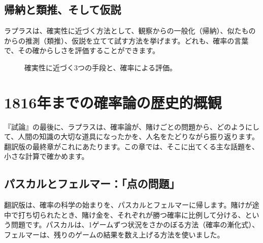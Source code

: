 \documentclass[a4paper,11pt,openany]{ltjsbook}
\begin{document}
\section{帰納と類推、そして仮説}

ラプラスは、確実性に近づく方法として、観察からの一般化（帰納）、似たものからの推測（類推）、仮説を立てて試す方法を挙げます。どれも、確率の言葉で、その確からしさを評価することができます。

\begin{figure}[htbp]
\centering
{}
\caption{確実性に近づく3つの手段と、確率による評価。}
\end{figure}

\chapter{1816年までの確率論の歴史的概観}

『試論』の最後に、ラプラスは、確率論が、賭けごとの問題から、どのようにして、人間の知識の大切な道具になったかを、人名をたどりながら振り返ります。翻訳版の最終章がこれにあたります。この章では、そこに出てくる主な話題を、小さな計算で確かめます。

\section{パスカルとフェルマー：「点の問題」}

翻訳版は、確率の科学の始まりを、パスカルとフェルマーに帰します。賭けが途中で打ち切られたとき、賭け金を、それぞれが勝つ確率に比例して分ける、という問題です。パスカルは、1ゲームずつ状況をさかのぼる方法（確率の漸化式）、フェルマーは、残りのゲームの結果を数え上げる方法を使いました。
\end{document}
